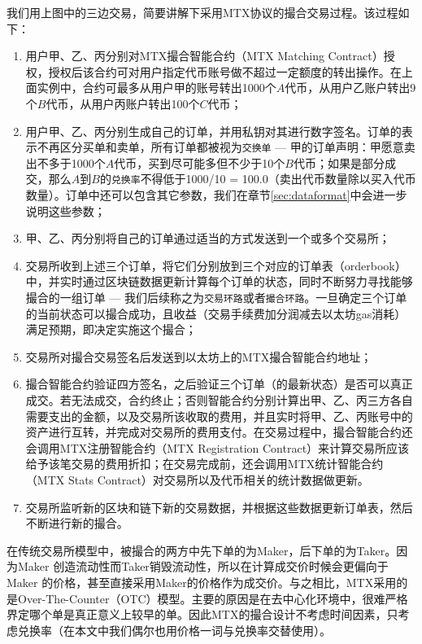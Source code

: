\documentclass[UTF8,nofonts]{ctexart}
\begin{document}
我们用上图中的三边交易，简要讲解下采用MTX协议的撮合交易过程。该过程如下：

\begin{enumerate}
	\item 用户甲、乙、丙分别对MTX撮合智能合约（MTX Matching Contract）授权，授权后该合约可对用户指定代币账号做不超过一定额度的转出操作。在上面实例中，合约可最多从用户甲的账号转出1000个$A$代币，从用户乙账户转出9个$B$代币，从用户丙账户转出100个$C$代币；
	\item 用户甲、乙、丙分别生成自己的订单，并用私钥对其进行数字签名。订单的表示不再区分买单和卖单，所有订单都被视为\texttt{交换单} --- 甲的订单声明：甲愿意卖出不多于1000个$A$代币，买到尽可能多但不少于10个$B$代币；如果是部分成交，那么$A$到$B$的\texttt{兑换率}不得低于1000/10 = 100.0（卖出代币数量除以买入代币数量）。订单中还可以包含其它参数，我们在章节\ref{sec:dataformat}中会进一步说明这些参数；
	\item 甲、乙、丙分别将自己的订单通过适当的方式发送到一个或多个交易所；
	\item 交易所收到上述三个订单，将它们分别放到三个对应的订单表（orderbook）中，并实时通过区块链数据更新计算每个订单的状态，同时不断努力寻找能够撮合的一组订单 --- 我们后续称之为\texttt{交易环路}或者\texttt{撮合环路}。一旦确定三个订单的当前状态可以撮合成功，且收益（交易手续费加分润减去以太坊gas消耗）满足预期，即决定实施这个撮合；
	\item 交易所对撮合交易签名后发送到以太坊上的MTX撮合智能合约地址；
	\item 撮合智能合约验证四方签名，之后验证三个订单（的最新状态）是否可以真正成交。若无法成交，合约终止；否则智能合约分别计算出甲、乙、丙三方各自需要支出的金额，以及交易所该收取的费用，并且实时将甲、乙、丙账号中的资产进行互转，并完成对交易所的费用支付。在交易过程中，撮合智能合约还会调用MTX注册智能合约（MTX Registration Contract）来计算交易所应该给予该笔交易的费用折扣；在交易完成前，还会调用MTX统计智能合约（MTX Stats Contract）对交易所以及代币相关的统计数据做更新。
	\item 交易所监听新的区块和链下新的交易数据，并根据这些数据更新订单表，然后不断进行新的撮合。
\end{enumerate}

在传统交易所模型中，被撮合的两方中先下单的为Maker，后下单的为Taker。因为Maker 创造流动性而Taker销毁流动性，所以在计算成交价时候会更偏向于Maker 的价格，甚至直接采用Maker的价格作为成交价。与之相比，MTX采用的是Over-The-Counter（OTC）模型。主要的原因是在去中心化环境中，很难严格界定哪个单是真正意义上较早的单。因此MTX的撮合设计不考虑时间因素，只考虑兑换率（在本文中我们偶尔也用价格一词与兑换率交替使用）。
\end{document}
